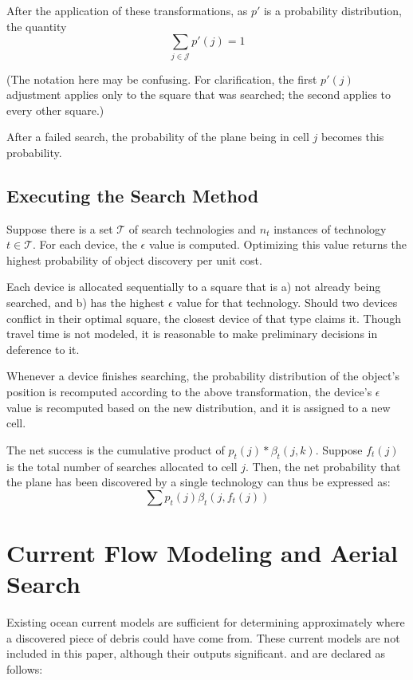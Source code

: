 \documentclass[a4paper]{article}
\begin{document}
After the application of these transformations, as $p'$ is a probability distribution, the quantity $$\sum_{j\in\mathcal{J}}p'(j) = 1$$

(The notation here may be confusing. For clarification, the first $p'(j)$ adjustment applies only to the square that was searched; the second applies to every other square.)

After a failed search, the probability of the plane being in cell $j$ becomes this probability.

\subsection{Executing the Search Method}

Suppose there is a set $\mathcal{T}$ of search technologies and $n_t$ instances of technology $t\in\mathcal{T}$. For each device, the $\epsilon$ value is computed. Optimizing this value returns the highest probability of object discovery per unit cost.

Each device is allocated sequentially to a square that is a) not already being searched, and b) has the highest $\epsilon$ value for that technology. Should two devices conflict in their optimal square, the closest device of that type claims it. Though travel time is not modeled, it is reasonable to make preliminary decisions in deference to it.

Whenever a device finishes searching, the probability distribution of the object's position is recomputed according to the above transformation, the device's $\epsilon$ value is recomputed based on the new distribution, and it is assigned to a new cell.

The net success is the cumulative product of $p_t(j)*\beta_t(j,k)$. Suppose $f_t(j)$ is the total number of searches allocated to cell $j$. Then, the net probability that the plane has been discovered by a single technology can thus be expressed as: $$\sum p_t(j)\beta_t(j,f_t(j))$$



\section{Current Flow Modeling and Aerial Search}

Existing ocean current models are sufficient for determining approximately where a discovered piece of debris could have come from. These current models are not included in this paper, although their outputs significant. and are declared as follows:
\end{document}
